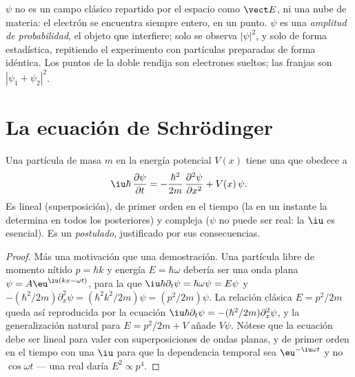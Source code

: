 \begin{remark}\label{rem:b2:schrodinger-wave-functions:not}
$\psi$ no es un campo clásico repartido por el espacio como $\vect E$, ni una
nube de materia: el electrón se encuentra siempre entero, en un punto.
$\psi$ es una \emph{amplitud de probabilidad}, el objeto que
interfiere; solo se observa $|\psi|^2$, y solo de forma estadística,
repitiendo el experimento con partículas preparadas de forma idéntica. Los puntos
de la doble rendija son electrones sueltos; las franjas son $|\psi_1 +
\psi_2|^2$.
\end{remark}

\section{La ecuación de Schrödinger}

\begin{theorem}\label{thm:b2:schrodinger-wave-functions:equation}
Una partícula de masa $m$ en la energía potencial $V(x)$ tiene una  que obedece a
\[
\iu\hbar\,\frac{\partial\psi}{\partial t} = -\frac{\hbar^2}{2m}\,\frac{\partial^2\psi}{\partial x^2} + V(x)\,\psi .
\]
Es lineal (superposición), de primer orden en el tiempo (la 
en un instante la determina en todos los posteriores) y compleja ($\psi$
no puede ser real: la $\iu$ es esencial). Es un \emph{postulado},
justificado por sus consecuencias.
\end{theorem}

\begin{proof}
Más una motivación que una demostración. Una partícula libre de momento nítido
$p = \hbar k$ y energía $E = \hbar\omega$ debería ser una onda plana $\psi =
A\eu^{\iu(kx - \omega t)}$, para la que $\iu\hbar\partial_t\psi = \hbar\omega\psi =
E\psi$ y $-(\hbar^2/2m)\partial_x^2\psi = (\hbar^2k^2/2m)\psi = (p^2/2m)\psi$.
La relación clásica $E = p^2/2m$ queda así reproducida por la ecuación
$\iu\hbar\partial_t\psi = -(\hbar^2/2m)\partial_x^2\psi$, y la generalización
natural para $E = p^2/2m + V$ añade $V\psi$. Nótese que la
ecuación debe ser lineal para valer con superposiciones de ondas planas, y
de primer orden en el tiempo con una $\iu$ para que la dependencia temporal sea
$\eu^{-\iu\omega t}$ y no $\cos\omega t$ --- una  real
daría $E^2 \propto p^4$.
\end{proof}

